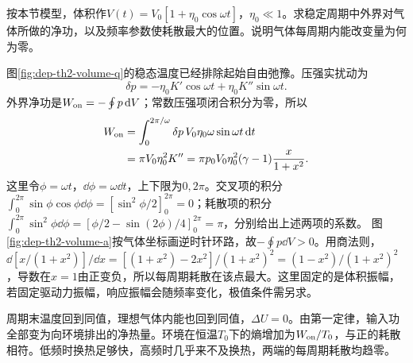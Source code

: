 \begin{example}
按本节模型，体积作$V(t)=V_0[1+\eta_0\cos\omega t]$，$\eta_0\ll1$。求稳定周期中外界对气体所做的净功，以及频率参数使耗散最大的位置。说明气体每周期内能改变量为何为零。
\end{example}
\begin{solution}
图\ref{fig:dep-th2-volume-q}的稳态温度已经排除起始自由弛豫。压强实扰动为
\[
 \delta p=-\eta_0K'\cos\omega t+\eta_0K''\sin\omega t.
\]
外界净功是$W_{\rm on}=-\oint p\mathop{}\!\mathrm d V$；常数压强项闭合积分为零，所以
\begin{align*}
 W_{\rm on}&=\int_0^{2\pi/\omega}
 \delta p\,V_0\eta_0\omega\sin\omega t\mathop{}\!\mathrm d t\\
 &=\pi V_0\eta_0^2K''
 =\pi p_0V_0\eta_0^2(\gamma-1)\frac{x}{1+x^2}.
\end{align*}
这里令$\phi=\omega t$，$\dd\phi=\omega\dd t$，上下限为$0,2\pi$。交叉项的积分$\int_0^{2\pi}\sin\phi\cos\phi\dd\phi=[\sin^2\phi/2]_0^{2\pi}=0$；耗散项的积分$\int_0^{2\pi}\sin^2\phi\dd\phi=[\phi/2-\sin(2\phi)/4]_0^{2\pi}=\pi$，分别给出上述两项的系数。
图\ref{fig:dep-th2-volume-a}按气体坐标画逆时针环路，故$-\oint p\dd V>0$。用商法则，$\dd[x/(1+x^2)]/\dd x=[(1+x^2)-2x^2]/(1+x^2)^2=(1-x^2)/(1+x^2)^2$，导数在$x=1$由正变负，所以每周期耗散在该点最大。这里固定的是体积振幅，若固定驱动力振幅，响应振幅会随频率变化，极值条件需另求。

周期末温度回到同值，理想气体内能也回到同值，$\Delta U=0$。由第一定律，输入功全部变为向环境排出的净热量。环境在恒温$T_0$下的熵增加为$W_{\rm on}/T_0$，与正的耗散相符。低频时换热足够快，高频时几乎来不及换热，两端的每周期耗散均趋零。
\end{solution}

